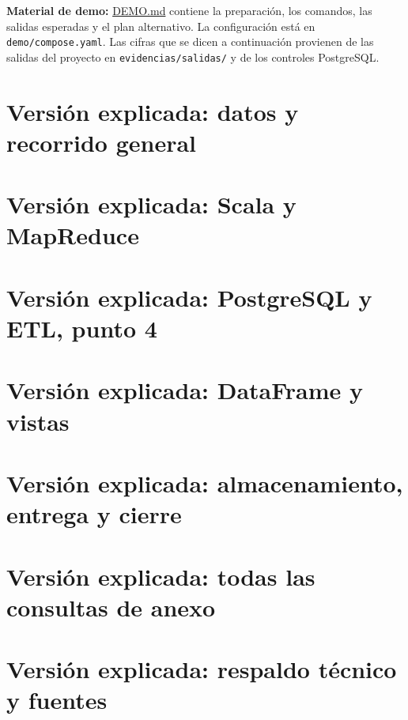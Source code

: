 \documentclass[10pt,a4paper]{article}
\begin{document}
\medskip\noindent\textbf{Material de demo:}
\href{run:DEMO.md}{DEMO.md} contiene la preparación, los comandos, las salidas esperadas
y el plan alternativo. La configuración está en \texttt{demo/compose.yaml}.
Las cifras que se dicen a continuación provienen de las salidas del proyecto en
\texttt{evidencias/salidas/} y de los controles PostgreSQL.

\clearpage
\tableofcontents
\clearpage
\section{Versión explicada: datos y recorrido general}

\section{Versión explicada: Scala y MapReduce}

\section{Versión explicada: PostgreSQL y ETL, punto 4}

\section{Versión explicada: DataFrame y vistas}

\section{Versión explicada: almacenamiento, entrega y cierre}

\section{Versión explicada: todas las consultas de anexo}


\section{Versión explicada: respaldo técnico y fuentes}

\clearpage

\clearpage

\clearpage

\end{document}
